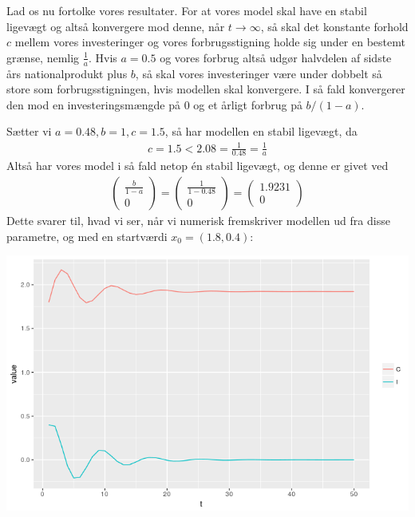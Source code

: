 \documentclass[12pt]{article}
\begin{document}
Lad os nu fortolke vores resultater. For at vores model skal have en stabil ligevægt og altså konvergere mod denne, når $t\to \infty$, så skal det konstante forhold $c$ mellem vores investeringer og vores forbrugsstigning holde sig under en bestemt grænse, nemlig $\frac{1}{a}$. Hvis $a=0.5$ og vores forbrug altså udgør halvdelen af sidste års nationalprodukt plus $b$, så skal vores investeringer være under dobbelt så store som forbrugsstigningen, hvis modellen skal konvergere. I så fald konvergerer den mod en investeringsmængde på 0 og et årligt forbrug på $b/(1-a)$.


Sætter vi $a=0.48, b=1, c=1.5$, så har modellen en stabil ligevægt, da 
\begin{align}
c = 1.5 < 2.08 = \frac{1}{0.48} = \frac{1}{a}
\end{align}
Altså har vores model i så fald netop én stabil ligevægt, og denne er givet ved
\begin{align}
\begin{pmatrix}
\frac{b}{1-a} \\
0
\end{pmatrix}=
\begin{pmatrix}
\frac{1}{1-0.48} \\
0
\end{pmatrix}= 
\begin{pmatrix}
1.9231 \\
0
\end{pmatrix}
\end{align}
Dette svarer til, hvad vi ser, når vi numerisk fremskriver modellen ud fra disse parametre, og med en startværdi $x_0 = (1.8, 0.4)$:

\begin{center}
\includegraphics[scale=0.75]{q1p1.png}
\end{center}
\end{document}
